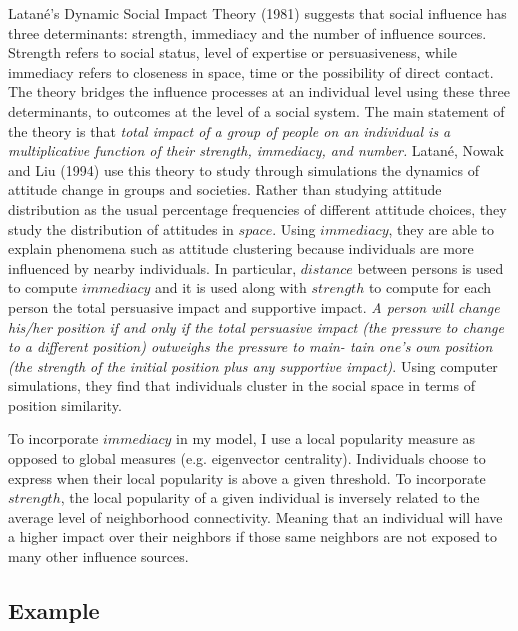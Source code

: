 \documentclass{article}
\begin{document}
Latan\'{e}'s Dynamic Social Impact Theory (1981)\cite{latane81} suggests that social influence has three determinants: strength, immediacy and the number of influence sources. Strength refers to social status, level of expertise or persuasiveness, while immediacy refers to closeness in space, time or the possibility of direct contact. The theory bridges the influence processes at an individual level using these three determinants, to outcomes at the level of a social system. The main statement of the theory is that \textit{total impact of a group of people on an individual is a multiplicative function of their strength, immediacy, and number.} Latan\'{e}, Nowak and Liu (1994)\cite{latane94} use this theory to study through simulations the dynamics of attitude change in groups and societies. Rather than studying attitude distribution as the usual percentage frequencies of different attitude choices, they study the distribution of attitudes in $space$. Using $immediacy$, they are able to explain phenomena such as attitude clustering because individuals are more influenced by nearby individuals. In particular, $distance$ between persons is used to compute $immediacy$ and it is used along with $strength$ to compute for each person the total persuasive impact and supportive impact. \textit{A person will change his/her position if and only if the total persuasive impact (the pressure to change to a different position) outweighs the pressure to main- tain one's own position (the strength of the initial position plus any supportive impact)}. Using computer simulations, they find that individuals cluster in the social space in terms of position similarity. 

To incorporate $immediacy$ in my model, I use a local popularity measure as opposed to global measures (e.g. eigenvector centrality). Individuals choose to express when their local popularity is above a given threshold. To incorporate $strength$, the local popularity of a given individual is inversely related to the average level of neighborhood connectivity. Meaning that an individual will have a higher impact over their neighbors if those same neighbors are not exposed to many other influence sources. %

\subsection{Example}
\end{document}
